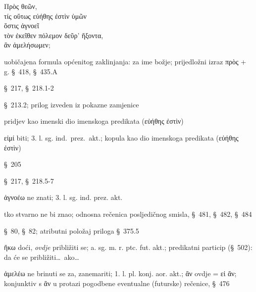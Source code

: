 
{\large
\begin{greek}
\noindent Πρὸς θεῶν,\\
τίς οὕτως εὐήθης ἐστὶν ὑμῶν \\
\tabto{2em} ὅστις ἀγνοεῖ \\
\tabto{3em} τὸν ἐκεῖθεν πόλεμον δεῦρ' ἥξοντα,\\
\tabto{3em} ἂν ἀμελήσωμεν;\\

\end{greek}
}

\begin{description}[noitemsep]
\item[Πρὸς θεῶν] uobičajena formula općenitog zaklinjanja: za ime božje; prijedložni izraz πρὸς + g. §~418, §~435.A
\item[τίς ] §~217, §~218.1-2
\item[οὕτως ] §~213.2; prilog izveden iz pokazne zamjenice
\item[εὐήθης ] pridjev kao imenski dio imenskoga predikata (εὐήθης ἐστὶν)
\item[ἐστὶν ] εἰμί biti; 3. l. sg. ind.\ prez.\ akt.; kopula kao dio imenskoga predikata (εὐήθης ἐστὶν)
\item[ὑμῶν ] §~205
\item[ὅστις ] §~217, §~218.5-7
\item[ἀγνοεῖ ] ἀγνοέω ne znati; 3. l. sg. ind. prez. akt. 
\item[ὅστις ἀγνοεῖ] tko stvarno ne bi znao; odnosna rečenica posljedičnog smisla, §~481, §~482, §~484
\item[τὸν ἐκεῖθεν πόλεμον] §~80, §~82; atributni položaj priloga §~375.5
\item[ἥξοντα] ἥκω doći, \textit{ovdje} približiti se; a. sg. m. r. ptc. fut. akt.; predikatni particip (§~502): da će se približiti\dots\ ako\dots
\item[ἂν ἀμελήσωμεν] ἀμελέω ne brinuti se za, zanemariti; 1. l. pl. konj. aor. akt.; ἂν ovdje = εἰ ἂν; konjunktiv s ἂν u protazi pogodbene eventualne (futurske) rečenice, §~476

\end{description}

